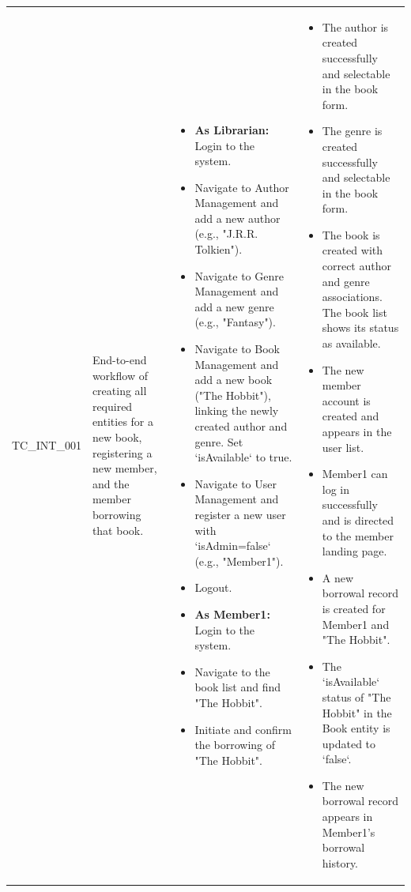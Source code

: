 \begin{longtable}{|>{\scriptsize\raggedright\arraybackslash}p{2cm}|>{\raggedright\arraybackslash}p{4cm}|>{\raggedright\arraybackslash}p{5cm}|>{\raggedright\arraybackslash}p{4.5cm}|}
\multicolumn{4}{|l|}{\textbf{Scenario: Full Lifecycle - From Entity Creation to Borrowal}} \\ \hline
TC\_INT\_001 & End-to-end workflow of creating all required entities for a new book, registering a new member, and the member borrowing that book. & 
    \begin{itemize}[noitemsep, topsep=0pt, partopsep=0pt, leftmargin=*]
        \item \textbf{As Librarian:} Login to the system.
        \item Navigate to Author Management and add a new author (e.g., "J.R.R. Tolkien").
        \item Navigate to Genre Management and add a new genre (e.g., "Fantasy").
        \item Navigate to Book Management and add a new book ("The Hobbit"), linking the newly created author and genre. Set `isAvailable` to true.
        \item Navigate to User Management and register a new user with `isAdmin=false` (e.g., "Member1").
        \item Logout.
        \item \textbf{As Member1:} Login to the system.
        \item Navigate to the book list and find "The Hobbit".
        \item Initiate and confirm the borrowing of "The Hobbit".
    \end{itemize} & 
    \begin{itemize}[noitemsep, topsep=0pt, partopsep=0pt, leftmargin=*]
        \item The author is created successfully and selectable in the book form.
        \item The genre is created successfully and selectable in the book form.
        \item The book is created with correct author and genre associations. The book list shows its status as available.
        \item The new member account is created and appears in the user list.
        \item Member1 can log in successfully and is directed to the member landing page.
        \item A new borrowal record is created for Member1 and "The Hobbit".
        \item The `isAvailable` status of "The Hobbit" in the Book entity is updated to `false`.
        \item The new borrowal record appears in Member1's borrowal history.
    \end{itemize} \\ \hline


\end{longtable}
